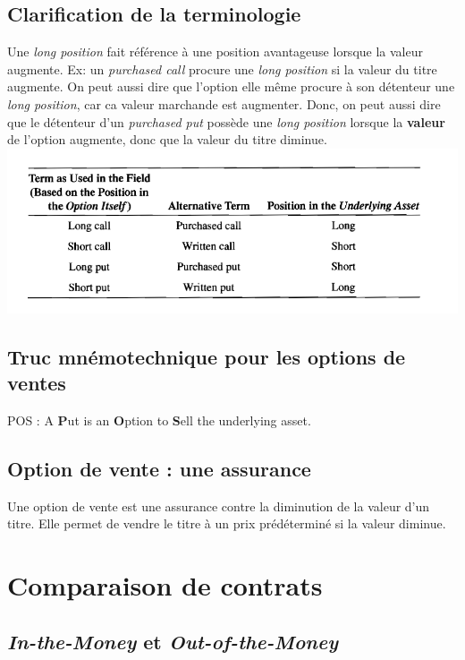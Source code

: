 \documentclass[11pt,french]{report}
\begin{document}
\section{Clarification de la terminologie}
\label{sec:clarification}

Une \emph{long position} fait référence à une position avantageuse lorsque la valeur augmente. Ex: un \emph{purchased call} procure une \emph{long position} si la valeur du titre augmente. On peut aussi dire que l'option elle même procure à son détenteur une \emph{long position}, car ca valeur marchande est augmenter. Donc, on peut aussi dire que le détenteur d'un \emph{purchased put} possède une \emph{long position} lorsque la \textbf{valeur} de l'option augmente, donc que la valeur du titre diminue. 
\\
\includegraphics[scale=0.55]{picture20.PNG}

\section{Truc mnémotechnique pour les options de ventes}
POS : A \textbf{P}ut is an \textbf{O}ption to \textbf{S}ell the underlying asset.

\section{Option de vente : une assurance}
\label{sec:option vente et assurance}

Une option de vente est une assurance contre la diminution de la valeur d'un titre. Elle permet de vendre le titre à un prix prédéterminé si la valeur diminue.





\chapter{Comparaison de contrats}
\label{chap:comparaison}

\section{\emph{In-the-Money} et \emph{Out-of-the-Money}}
\label{sec:in and out of the money}
\end{document}
